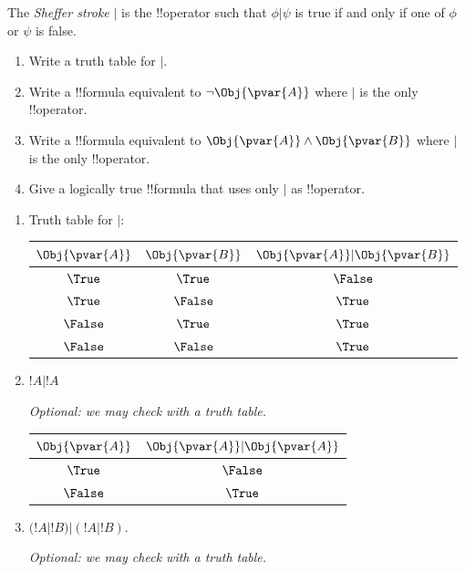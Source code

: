 \documentclass[../../../include/open-logic-section]{subfiles}
\begin{document}
\begin{prob}
    The \emph{Sheffer stroke} $|$ is the !!{operator} such
    that $\phi|\psi$ is true if and only if one of $\phi$ or $\psi$ is
    false. 
    \begin{enumerate}
    \item Write a truth table for $|$.
    \item Write a !!{formula} equivalent to $\lnot \Obj{\pvar{A}}$ where $|$ is the only !!{operator}.
    \item Write a !!{formula} equivalent to $\Obj{\pvar{A}}\land \Obj{\pvar{B}}$ where $|$ is the only !!{operator}.
    \item Give a logically true !!{formula} that uses only $|$ as !!{operator}.
    \end{enumerate}

    \begin{ans}
    \begin{enumerate}
    \item Truth table for $|$:
    
        \begin{tabular}{cc|c}
        \hline
        $\Obj{\pvar{A}}$ & $\Obj{\pvar{B}}$ & $\Obj{\pvar{A}}|\Obj{\pvar{B}}$ \\
        \hline
        $\True$ & $\True$ & $\False$\\
        $\True$ & $\False$ & $\True$\\
        $\False$ & $\True$ & $\True$\\
        $\False$ & $\False$ & $\True$\\
        \hline
        \end{tabular}

    \item $!A|!A$
    
    \emph{Optional: we may check with a truth table.} 
    \begin{tabular}{c|c}
        \hline
        $\Obj{\pvar{A}}$ & $\Obj{\pvar{A}}|\Obj{\pvar{A}}$ \\
        \hline
        $\True$ & $\False$\\
        $\False$ &  $\True$\\
        \hline
        \end{tabular}
    
    \item $(!A|!B)|(!A|!B)$.
    
    \emph{Optional: we may check with a truth table.} 


\end{enumerate}
\end{ans}
\end{prob}
\end{document}
